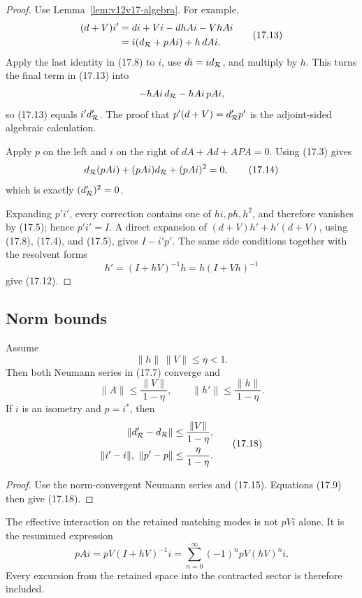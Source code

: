 \documentclass[11pt]{article}
\theoremstyle{remark}
\begin{document}
\begin{proof}
Use Lemma~\ref{lem:v12v17-algebra}.  For example,
\[
\begin{split}
 (d+V)i'
 &=di+Vi-dhAi-VhAi\\
 &=i(d_{\cal R}+pAi)+h\,dAi.
\end{split}                                                  \tag{17.13}
\]
Apply the last identity in (17.8) to \(i\), use
\(di=id_{\cal R}\), and multiply by \(h\).  This turns the final term
in (17.13) into
\[
 -hAi\,d_{\cal R}-hAi\,pAi,
\]
so (17.13) equals \(i'd_{\cal R}'\).  The proof that
\(p'(d+V)=d_{\cal R}'p'\) is the adjoint-sided algebraic calculation.

Apply \(p\) on the left and \(i\) on the right of
\(dA+Ad+APA=0\).  Using (17.3) gives
\[
 d_{\cal R}(pAi)+(pAi)d_{\cal R}+(pAi)^2=0,                 \tag{17.14}
\]
which is exactly \((d_{\cal R}')^2=0\).

Expanding \(p'i'\), every correction contains one of
\(hi,ph,h^2\), and therefore vanishes by (17.5); hence \(p'i'=I\).
A direct expansion of
\((d+V)h'+h'(d+V)\), using (17.8), (17.4), and (17.5), gives
\(I-i'p'\).  The same side conditions together with the resolvent
forms
\[
 h'=(I+hV)^{-1}h=h(I+Vh)^{-1}                              \tag{17.15}
\]
give (17.12).
\end{proof}

\subsection{Norm bounds}

Assume
\[
 \|h\|\,\|V\|\le\eta<1.                                    \tag{17.16}
\]
Then both Neumann series in (17.7) converge and
\[
 \|A\|\le\frac{\|V\|}{1-\eta},\qquad
 \boxed{\|h'\|\le\frac{\|h\|}{1-\eta}.}                    \tag{17.17}
\]
If \(i\) is an isometry and \(p=i^*\), then
\[
\begin{split}
 \|d_{\cal R}'-d_{\cal R}\|
 &\le\frac{\|V\|}{1-\eta},\\
 \|i'-i\|,\ \|p'-p\|
 &\le\frac{\eta}{1-\eta}.
\end{split}                                                  \tag{17.18}
\]

\begin{proof}
Use the norm-convergent Neumann series and (17.15).  Equations
(17.9) then give (17.18).
\end{proof}

The effective interaction on the retained matching modes is not
\(pVi\) alone.  It is the resummed expression
\[
 \boxed{
 pAi=pV(I+hV)^{-1}i
 =\sum_{n=0}^{\infty}(-1)^n pV(hV)^n i.}                   \tag{17.19}
\]
Every excursion from the retained space into the contracted sector
is therefore included.
\end{document}
